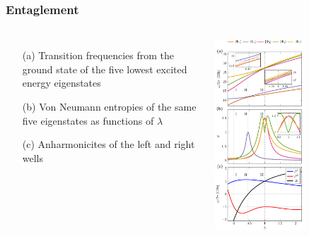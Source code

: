 \documentclass{beamer}
\begin{document}
\frame
    {
      \frametitle{Entaglement}
	
      \begin{footnotesize}
     \begin{columns}
       \column{5.0cm}
\begin{itemize}
\item[(a)] Transition frequencies from the ground state of the five lowest excited energy eigenstates

\item[(b)] Von Neumann entropies of the same five eigenstates as functions of $\lambda$

\item[(c)] Anharmonicites of the left and right wells 
\end{itemize}

\column{6cm}
      \begin{center}
	\includegraphics[width=0.6\textwidth]{qcfigures/entanglement.pdf}
      \end{center}
\end{columns}
      \end{footnotesize}
    }
\end{document}
